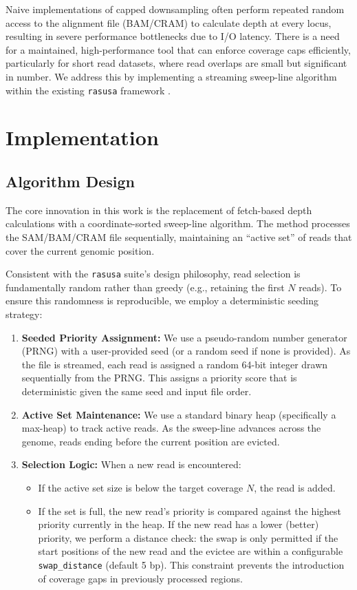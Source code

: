 \documentclass[a4paper,num-refs,gigabyte]{oup-contemporary}
\begin{document}
Naive implementations of capped downsampling often perform repeated random access to the alignment file (BAM/CRAM) to calculate depth at every locus, resulting in severe performance bottlenecks due to I/O latency. There is a need for a maintained, high-performance tool that can enforce coverage caps efficiently, particularly for short read datasets, where read overlaps are small but significant in number. We address this by implementing a streaming sweep-line algorithm within the existing \texttt{rasusa} framework \citep{hall_rasusa_2022}.

\section{Implementation}

\subsection{Algorithm Design}
The core innovation in this work is the replacement of fetch-based depth calculations with a coordinate-sorted sweep-line algorithm. The method processes the SAM/BAM/CRAM file sequentially, maintaining an ``active set'' of reads that cover the current genomic position.

Consistent with the \texttt{rasusa} suite's design philosophy, read selection is fundamentally random rather than greedy (e.g., retaining the first $N$ reads). To ensure this randomness is reproducible, we employ a deterministic seeding strategy:

\begin{enumerate}
    \item \textbf{Seeded Priority Assignment:} We use a pseudo-random number generator (PRNG) with a user-provided seed (or a random seed if none is provided). As the file is streamed, each read is assigned a random 64-bit integer drawn sequentially from the PRNG. This assigns a priority score that is deterministic given the same seed and input file order.
    \item \textbf{Active Set Maintenance:} We use a standard binary heap (specifically a max-heap) to track active reads. As the sweep-line advances across the genome, reads ending before the current position are evicted.
    \item \textbf{Selection Logic:} When a new read is encountered:
    \begin{itemize}
        \item If the active set size is below the target coverage $N$, the read is added.
        \item If the set is full, the new read's priority is compared against the highest priority currently in the heap. If the new read has a lower (better) priority, we perform a distance check: the swap is only permitted if the start positions of the new read and the evictee are within a configurable \texttt{swap\_distance} (default 5 bp). This constraint prevents the introduction of coverage gaps in previously processed regions.   
    \end{itemize}
\end{enumerate}
\end{document}
